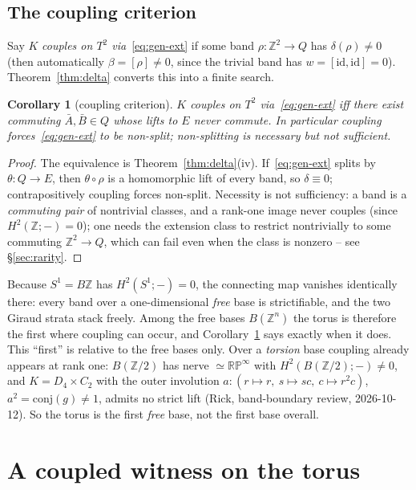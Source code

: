 \documentclass[11pt]{article}
\newtheorem{corollary}[theorem]{Corollary}
\theoremstyle{definition}
\newcommand{\id}{\mathrm{id}}
\newcommand{\Z}{\mathbb{Z}}
\begin{document}
\subsection{The coupling criterion}\label{sub:couple}

Say $K$ \emph{couples on $T^2$ via}~\eqref{eq:gen-ext} if some band $\rho\colon\Z^2\to Q$ has
$\delta(\rho)\neq0$ (then automatically $\beta=[\rho]\neq0$, since the trivial band has
$w=[\id,\id]=0$). Theorem~\ref{thm:delta} converts this into a finite search.

\begin{corollary}[coupling criterion]\label{cor:couple}
$K$ couples on $T^2$ via~\eqref{eq:gen-ext} iff there exist commuting $\bar A,\bar B\in Q$ whose
lifts to $E$ never commute. In particular coupling forces~\eqref{eq:gen-ext} to be
\emph{non-split}; non-splitting is necessary but not sufficient.
\end{corollary}

\begin{proof}
The equivalence is Theorem~\ref{thm:delta}(iv). If~\eqref{eq:gen-ext} splits by
$\theta\colon Q\to E$, then $\theta\circ\rho$ is a homomorphic lift of every band, so
$\delta\equiv0$; contrapositively coupling forces non-split. Necessity is not sufficiency: a
band is a \emph{commuting pair} of nontrivial classes, and a rank-one image never couples
(since $H^2(\Z;-)=0$); one needs the extension class to restrict nontrivially to some commuting
$\Z^2\to Q$, which can fail even when the class is nonzero -- see \S\ref{sec:rarity}.
\end{proof}

Because $S^1=B\Z$ has $H^2(S^1;-)=0$, the connecting map vanishes identically there: every band
over a one-dimensional \emph{free} base is strictifiable, and the two Giraud strata stack freely.
Among the free bases $B(\Z^n)$ the torus is therefore the first where coupling can occur, and
Corollary~\ref{cor:couple} says exactly when it does. This ``first'' is relative to the free
bases only. Over a \emph{torsion} base coupling already appears at rank one: $B(\Z/2)$ has nerve
$\simeq\mathbb{RP}^\infty$ with $H^2(B(\Z/2);-)\neq0$, and $K=D_4\times C_2$ with the outer
involution $a\colon(r\mapsto r,\ s\mapsto sc,\ c\mapsto r^2c)$, $a^2=\mathrm{conj}(g)\neq1$,
admits no strict lift (Rick, band-boundary review, 2026-10-12). So the torus is the first
\emph{free} base, not the first base overall.

\section{A coupled witness on the torus}\label{sec:witness}
\end{document}
